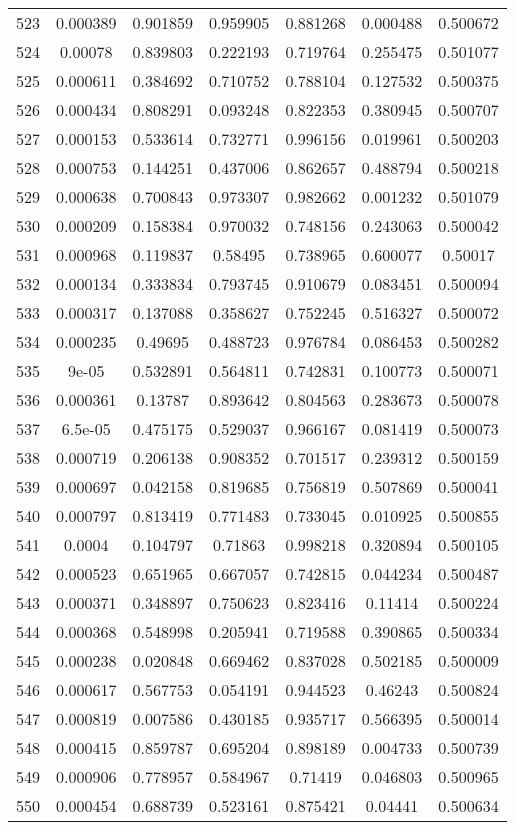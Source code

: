 \begin{table}
\begin{tabular}{c|c|c|c|c|c|c}
523 & 0.000389 & 0.901859 & 0.959905 & 0.881268 & 0.000488 & 0.500672\\
524 & 0.00078 & 0.839803 & 0.222193 & 0.719764 & 0.255475 & 0.501077\\
525 & 0.000611 & 0.384692 & 0.710752 & 0.788104 & 0.127532 & 0.500375\\
526 & 0.000434 & 0.808291 & 0.093248 & 0.822353 & 0.380945 & 0.500707\\
527 & 0.000153 & 0.533614 & 0.732771 & 0.996156 & 0.019961 & 0.500203\\
528 & 0.000753 & 0.144251 & 0.437006 & 0.862657 & 0.488794 & 0.500218\\
529 & 0.000638 & 0.700843 & 0.973307 & 0.982662 & 0.001232 & 0.501079\\
530 & 0.000209 & 0.158384 & 0.970032 & 0.748156 & 0.243063 & 0.500042\\
531 & 0.000968 & 0.119837 & 0.58495 & 0.738965 & 0.600077 & 0.50017\\
532 & 0.000134 & 0.333834 & 0.793745 & 0.910679 & 0.083451 & 0.500094\\
533 & 0.000317 & 0.137088 & 0.358627 & 0.752245 & 0.516327 & 0.500072\\
534 & 0.000235 & 0.49695 & 0.488723 & 0.976784 & 0.086453 & 0.500282\\
535 & 9e-05 & 0.532891 & 0.564811 & 0.742831 & 0.100773 & 0.500071\\
536 & 0.000361 & 0.13787 & 0.893642 & 0.804563 & 0.283673 & 0.500078\\
537 & 6.5e-05 & 0.475175 & 0.529037 & 0.966167 & 0.081419 & 0.500073\\
538 & 0.000719 & 0.206138 & 0.908352 & 0.701517 & 0.239312 & 0.500159\\
539 & 0.000697 & 0.042158 & 0.819685 & 0.756819 & 0.507869 & 0.500041\\
540 & 0.000797 & 0.813419 & 0.771483 & 0.733045 & 0.010925 & 0.500855\\
541 & 0.0004 & 0.104797 & 0.71863 & 0.998218 & 0.320894 & 0.500105\\
542 & 0.000523 & 0.651965 & 0.667057 & 0.742815 & 0.044234 & 0.500487\\
543 & 0.000371 & 0.348897 & 0.750623 & 0.823416 & 0.11414 & 0.500224\\
544 & 0.000368 & 0.548998 & 0.205941 & 0.719588 & 0.390865 & 0.500334\\
545 & 0.000238 & 0.020848 & 0.669462 & 0.837028 & 0.502185 & 0.500009\\
546 & 0.000617 & 0.567753 & 0.054191 & 0.944523 & 0.46243 & 0.500824\\
547 & 0.000819 & 0.007586 & 0.430185 & 0.935717 & 0.566395 & 0.500014\\
548 & 0.000415 & 0.859787 & 0.695204 & 0.898189 & 0.004733 & 0.500739\\
549 & 0.000906 & 0.778957 & 0.584967 & 0.71419 & 0.046803 & 0.500965\\
550 & 0.000454 & 0.688739 & 0.523161 & 0.875421 & 0.04441 & 0.500634\\
\end{tabular}
\end{table}
